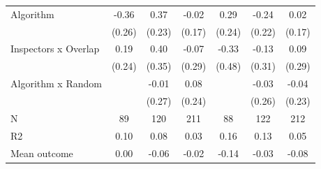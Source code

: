 \begin{tabular}{lccc|ccc}
Algorithm   &       -0.36         &        0.37         &       -0.02         &        0.29         &       -0.24         &        0.02         \\
            &      (0.26)         &      (0.23)         &      (0.17)         &      (0.24)         &      (0.22)         &      (0.17)         \\
\addlinespace
Inspectors x Overlap&        0.19         &        0.40         &       -0.07         &       -0.33         &       -0.13         &        0.09         \\
            &      (0.24)         &      (0.35)         &      (0.29)         &      (0.48)         &      (0.31)         &      (0.29)         \\
\addlinespace
Algorithm x Random&                     &       -0.01         &        0.08         &                     &       -0.03         &       -0.04         \\
            &                     &      (0.27)         &      (0.24)         &                     &      (0.26)         &      (0.23)         \\
\midrule
N           &          89         &         120         &         211         &          88         &         122         &         212         \\
R2          &        0.10         &        0.08         &        0.03         &        0.16         &        0.13         &        0.05         \\
Mean outcome&        0.00         &       -0.06         &       -0.02         &       -0.14         &       -0.03         &       -0.08         \\
\bottomrule \end{tabular}
